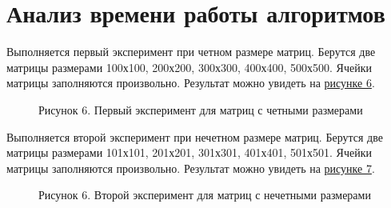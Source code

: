 \documentclass[12pt]{report}
\begin{document}
	\section{Анализ времени работы алгоритмов }
	Выполняется первый эксперимент при четном размере матриц. Берутся две матрицы размерами 100х100, 200х200, 300х300, 400х400, 500х500. Ячейки матрицы заполняются произвольно. Результат можно увидеть на \hyperref[Graphics1]{рисунке 6}.
	\begin{figure}[h!]\label{Graphics1}
		\caption*{Рисунок 6. Первый эксперимент для матриц с четными размерами}
	\end{figure} 
	\newpage
	\noindent Выполняется второй эксперимент при нечетном размере матриц. Берутся две матрицы размерами 101х101, 201х201, 301х301, 401х401, 501х501. Ячейки матрицы заполняются произвольно. Результат можно увидеть на \hyperref[Graphics2]{рисунке 7}.
	\begin{figure}[h!]\label{Graphics2}
		\caption*{Рисунок 6. Второй эксперимент для матриц с нечетными размерами}
	\end{figure} 
	\newpage
	
\end{document}
